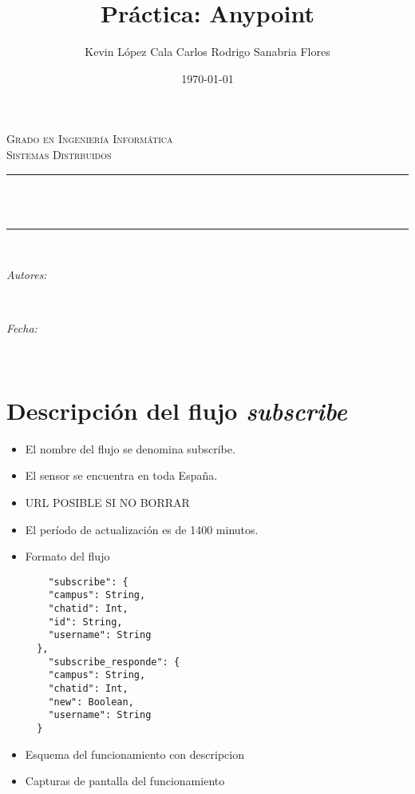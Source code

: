 \documentclass[12pt]{article}
\title{Práctica: Anypoint}
\author{Kevin López Cala \break Carlos Rodrigo Sanabria Flores}
\date{\today}
\makeatletter
\let\thetitle\@title
\let\theauthor\@author
\let\thedate\@date
\makeatother
\begin{document}

\begin{titlepage}
	\centering
    \vspace*{0.5 cm}
   \textsc{\Large Grado en Ingeniería Informática}\\[0.5 cm]		 %
    \textsc{\LARGE Sistemas Distrbuidos}\\[0.5 cm]	%
	\rule{\linewidth}{0.2 mm} \\[0.4 cm]
	{ \huge \bfseries \thetitle}\\
	\rule{\linewidth}{0.2 mm} \\[1.5 cm]

	\begin{minipage}{0.4\textwidth}
		\begin{flushleft} \large
			\emph{Autores:}\\
			\theauthor
			\end{flushleft}
			\end{minipage}~
			\begin{minipage}{0.453\textwidth}
			\begin{flushright} \large
            	\emph{Fecha:}\\
				\thedate
		\end{flushright}
	\end{minipage}\\[2 cm]
    \vfill
\end{titlepage}
\pagebreak
\section{Descripción del flujo \textit{subscribe}}
    \begin{itemize}
        \item El nombre del flujo se denomina subscribe.
        \item El sensor se encuentra en toda España.
        \item URL POSIBLE SI NO BORRAR
        \item El período de actualización es de 1400 minutos.
        \item Formato del flujo 
    \begin{lstlisting}         
    "subscribe": {
    "campus": String,
    "chatid": Int,
    "id": String,
    "username": String
  },
    "subscribe_responde": {
    "campus": String,
    "chatid": Int,
    "new": Boolean,
    "username": String
  }
        \end{lstlisting}
    \item Esquema del funcionamiento con descripcion
    \item Capturas de pantalla del funcionamiento
\end{itemize}
\end{document}
